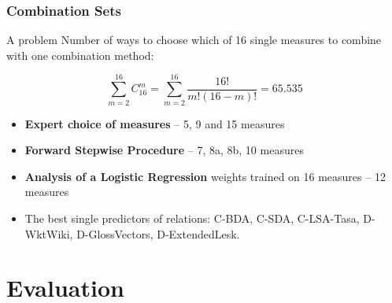 \documentclass{beamer}
\begin{document}
\begin{frame}
\frametitle{Combination Sets}

\begin{block}{A problem}
 Number of ways to choose which of 16 single measures to combine with one combination method:

$$\sum_{m=2}^{16}C_{16}^m=\sum_{m=2}^{16}\frac{16!}{m!(16-m)!}=65.535$$
 
\end{block}

\begin{itemize}
 
\item \textbf{Expert choice of measures} -- 5, 9 and 15 measures
\item \textbf{Forward Stepwise Procedure} -- 7, 8a, 8b, 10 measures 
\item \textbf{Analysis of a Logistic Regression} weights trained on 16 measures
 -- 12 measures

\pause

\item The \alert{best single predictors} of relations: C-BDA, C-SDA, C-LSA-Tasa, D-WktWiki, D-GlossVectors,  D-ExtendedLesk.


\end{itemize}
\end{frame}
  

\section{Evaluation}
\subsection{}
\end{document}
